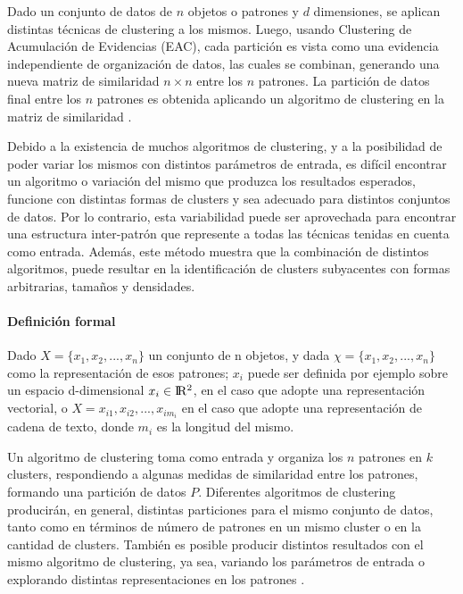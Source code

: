 \bigskip Dado un conjunto de datos de \(n\) objetos o patrones y \(d\) dimensiones, se aplican distintas técnicas de clustering a los mismos. Luego, usando Clustering de Acumulación de Evidencias (EAC), cada partición es vista como una evidencia independiente de organización de datos, las cuales se combinan, generando una nueva matriz de similaridad  \(n \times n\) entre los \(n\) patrones. La partición de datos final entre los \(n\) patrones es obtenida aplicando un algoritmo de clustering en la matriz de similaridad \citep{fred2005combining}.

\bigskip Debido a la existencia de muchos algoritmos de clustering, y a la posibilidad de poder variar los mismos con distintos parámetros de entrada, es difícil encontrar un algoritmo o variación del mismo que produzca los resultados esperados, funcione con distintas formas de clusters y sea adecuado para distintos conjuntos de datos. Por lo contrario, esta variabilidad puede ser aprovechada para encontrar una estructura inter-patrón que represente a todas las técnicas tenidas en cuenta como entrada. Además, este método muestra que la combinación de distintos algoritmos, puede resultar en la identificación de clusters subyacentes con formas arbitrarias, tamaños y densidades.

\paragraph{Definición formal}
Dado \(X = \{x_1, x_2,... , x_n\}\) un conjunto de n objetos, y dada \(\chi = \{x_1, x_2,... , x_n\}\) como la representación de esos patrones; \(x_i\) puede ser definida por ejemplo sobre un espacio d-dimensional \(x_i \in \rm I\!R^2\), en el caso que adopte una representación vectorial, o \(X = x_{i1}, x_{i2},... , x_{im_i}\) en el caso que adopte una representación de cadena de texto, donde \(m_i\) es la longitud del mismo.

Un algoritmo de clustering toma  como entrada y organiza los \(n\) patrones en \(k\) clusters, respondiendo a algunas medidas de similaridad entre los patrones, formando una partición de datos \(P\). Diferentes algoritmos de clustering producirán, en general, distintas particiones para el mismo conjunto de datos, tanto como en términos de número de patrones en un mismo cluster o en la cantidad de clusters. También es posible producir distintos resultados con el mismo algoritmo de clustering, ya sea, variando los parámetros de entrada o explorando distintas representaciones en los patrones \citep{fred2005combining}.

